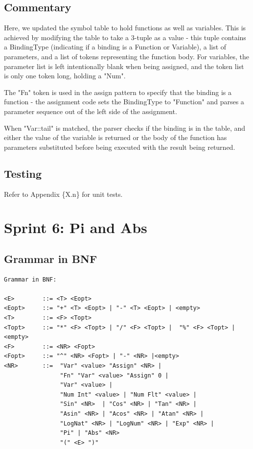 \documentclass[a4paper, oneside, 11pt]{report}
\begin{document}
	\subsection{Commentary}
	Here, we updated the symbol table to hold functions as well as variables. This is achieved by modifying the table to take a 3-tuple as a value - this tuple contains a BindingType (indicating if a binding is a Function or Variable), a list of parameters, and a list of tokens representing the function body. For variables, the parameter list is left intentionally blank when being assigned, and the token list is only one token long, holding a "Num".

	The "Fn" token is used in the assign pattern to specify that the binding is a function - the assignment code sets the BindingType to "Function" and parses a parameter sequence out of the left side of the assignment.

	When "Var::tail" is matched, the parser checks if the binding is in the table, and either the value of the variable is returned or the body of the function has parameters substituted before being executed with the result being returned.

	\subsection{Testing}
	Refer to Appendix \{X.n\} for unit tests.

	\clearpage
	\section{Sprint 6: Pi and Abs}
	\subsection{Grammar in BNF}
	\begin{verbatim}
Grammar in BNF:

<E>        ::= <T> <Eopt>
<Eopt>     ::= "+" <T> <Eopt> | "-" <T> <Eopt> | <empty>
<T>        ::= <F> <Topt>
<Topt>     ::= "*" <F> <Topt> | "/" <F> <Topt> |  "%" <F> <Topt> |<empty>
<F>        ::= <NR> <Fopt>
<Fopt>     ::= "^" <NR> <Fopt> | "-" <NR> |<empty>
<NR>       ::=  "Var" <value> "Assign" <NR> |
                "Fn" "Var" <value> "Assign" 0 |
                "Var" <value> |
                "Num Int" <value> | "Num Flt" <value> |
                "Sin" <NR>  | "Cos" <NR> | "Tan" <NR> |
                "Asin" <NR> | "Acos" <NR> | "Atan" <NR> |
                "LogNat" <NR> | "LogNum" <NR> | "Exp" <NR> |
                "Pi" | "Abs" <NR>
                "(" <E> ")"
	\end{verbatim}
\end{document}

